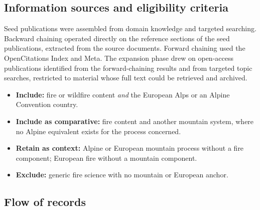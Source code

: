 \documentclass[11pt,a4paper]{article}
\begin{document}
\subsection{Information sources and eligibility criteria}

Seed publications were assembled from domain knowledge and targeted searching. Backward chaining operated directly on the reference sections of the seed publications, extracted from the source documents. Forward chaining used the OpenCitations Index and Meta. The expansion phase drew on open-access publications identified from the forward-chaining results and from targeted topic searches, restricted to material whose full text could be retrieved and archived.

\begin{itemize}
    \item \textbf{Include:} fire or wildfire content \emph{and} the European Alps or an Alpine Convention country.
    \item \textbf{Include as comparative:} fire content and another mountain system, where no Alpine equivalent exists for the process concerned.
    \item \textbf{Retain as context:} Alpine or European mountain process without a fire component; European fire without a mountain component.
    \item \textbf{Exclude:} generic fire science with no mountain or European anchor.
\end{itemize}

\subsection{Flow of records}
\end{document}
